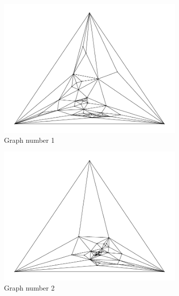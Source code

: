 \documentclass[12pt]{article}
\begin{document}
  \begin{figure}[H]
      \centering 
      \begin{subfigure}[b]{0.45\textwidth}
          \centering 
          \includegraphics[width = \textwidth]{../output/Q9-random-405.pdf}
          \caption{Graph number 1}
      \end{subfigure}
      \hfill
      \begin{subfigure}[b]{0.45\textwidth}
          \centering 
          \includegraphics[width = \textwidth]{../output/Q9-random-409.pdf}
          \caption{Graph number 2}
      \end{subfigure}
      \hfill
      \begin{subfigure}[b]{0.45\textwidth}

\end{subfigure}
\end{figure}
\end{document}
